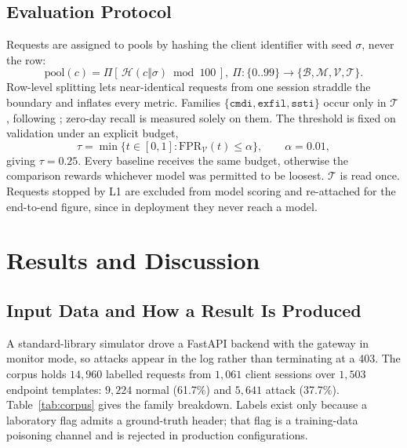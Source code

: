 \documentclass[conference]{IEEEtran}
\begin{document}
\subsection{Evaluation Protocol}
\label{sec:protocol}
Requests are assigned to pools by hashing the client identifier with seed $\sigma$, never the
row:
\begin{equation}
\text{pool}(c)=\Pi\!\left[\,\mathcal{H}(c\Vert\sigma)\bmod 100\,\right],\
\Pi:\{0..99\}\rightarrow\{\mathcal{B},\mathcal{M},\mathcal{V},\mathcal{T}\}.
\label{eq:pool}
\end{equation}
Row-level splitting lets near-identical requests from one session straddle the boundary and
inflates every metric. Families $\{\texttt{cmdi},\texttt{exfil},\texttt{ssti}\}$ occur only in
$\mathcal{T}$, following \cite{alam2025adaptive}; zero-day recall is measured solely on them.
The threshold is fixed on validation under an explicit budget,
\begin{equation}
\tau=\min\{t\in[0,1]:\mathrm{FPR}_{\mathcal{V}}(t)\le\alpha\},\qquad \alpha=0.01,
\label{eq:tau}
\end{equation}
giving $\tau=0.25$. Every baseline receives the same budget, otherwise the comparison rewards
whichever model was permitted to be loosest. $\mathcal{T}$ is read once. Requests stopped by
L1 are excluded from model scoring and re-attached for the end-to-end figure, since in
deployment they never reach a model.

\section{Results and Discussion}
\label{sec:results}
\subsection{Input Data and How a Result Is Produced}
\label{sec:inputs}
A standard-library simulator drove a FastAPI backend with the gateway in monitor mode, so
attacks appear in the log rather than terminating at a 403. The corpus holds $14{,}960$
labelled requests from $1{,}061$ client sessions over $1{,}503$ endpoint templates:
$9{,}224$ normal (61.7\%) and $5{,}641$ attack (37.7\%). Table~\ref{tab:corpus} gives the
family breakdown. Labels exist only because a laboratory flag admits a ground-truth header;
that flag is a training-data poisoning channel and is rejected in production configurations.
\end{document}
